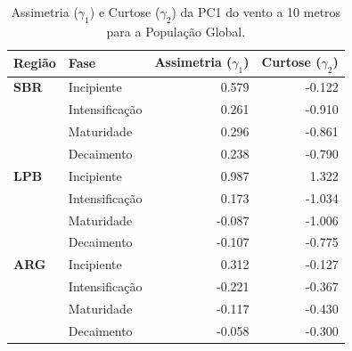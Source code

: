 \begin{table}[htbp]
\centering
\caption[Assimetria e Curtose da PC1 do vento a 10 m --- População Global]{Assimetria ($\gamma_1$) e Curtose ($\gamma_2$) da PC1 do vento a 10 metros para a População Global.}
\label{tab:momentos_global_w10}
\begin{tabular*}{\textwidth}{@{\extracolsep{\fill}}llrr}
\hline
\textbf{Região} & \textbf{Fase} & \textbf{Assimetria ($\gamma_1$)} & \textbf{Curtose ($\gamma_2$)} \\
\hline
\textbf{SBR} & Incipiente & 0.579 & -0.122 \\
 & Intensificação & 0.261 & -0.910 \\
 & Maturidade & 0.296 & -0.861 \\
 & Decaimento & 0.238 & -0.790 \\
\hline
\textbf{LPB} & Incipiente & 0.987 & 1.322 \\
 & Intensificação & 0.173 & -1.034 \\
 & Maturidade & -0.087 & -1.006 \\
 & Decaimento & -0.107 & -0.775 \\
\hline
\textbf{ARG} & Incipiente & 0.312 & -0.127 \\
 & Intensificação & -0.221 & -0.367 \\
 & Maturidade & -0.117 & -0.430 \\
 & Decaimento & -0.058 & -0.300 \\
\hline
\end{tabular*}
\end{table}